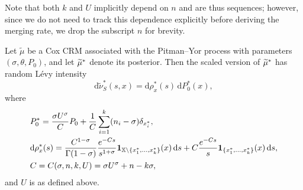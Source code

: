 Note that both $k$ and $U$ implicitly depend on $n$ and are thus sequences; however, since we do not need to track this dependence explicitly before deriving the merging rate, we drop the subscript $n$ for brevity.
\begin{proposition}
    \label{proposition:posterior_pitmanyor}
    Let $\tilde{\mu}$ be a Cox CRM associated with the Pitman--Yor process with parameters $(\sigma, \theta, P_0)$, and let $\widetilde{\mu}^*$ denote its posterior. Then the scaled version of $\widetilde{\mu}^*$ has random L\'evy intensity
    \[
    \mathrm{d}\tilde{\nu}^*_{S}(s,x) =  \mathrm{d}\rho_x^*(s)\,\mathrm{d}P^*_0(x),
    \]
    where
    \begin{align*}
        & P^*_0 = \frac{\sigma U^\sigma}{C}P_0 + \frac{1}{C}\sum_{i = 1}^k (n_i - \sigma) \delta_{x_i^*},\\
        & \mathrm{d}\rho^*_x(s) = \frac{C^{1-\sigma}}{\Gamma(1-\sigma)}\frac{e^{-Cs}}{s^{1+\sigma}}\mathbf{1}_{\mathbb{X} \setminus\{x_1^*,\dots, x_k^*\}}(x)\,\mathrm{d}s + C\frac{e^{-Cs}}{s}\mathbf{1}_{\{x_1^*,\dots, x_k^*\}}(x)\,\mathrm{d}s, \\
        & C = C(\sigma, n, k, U) =  \sigma U^\sigma + n - k\sigma,
    \end{align*}
    and $U$ is as defined above.
\end{proposition}
